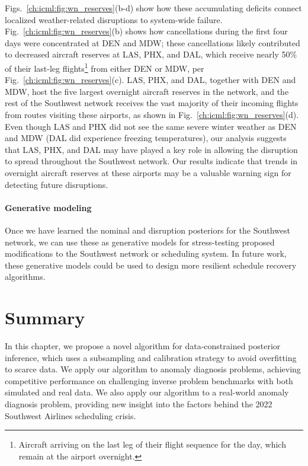 Figs.~\ref{ch:icml:fig:wn_reserves}(b-d) show how these accumulating deficits connect localized weather-related disruptions to system-wide failure. Fig.~\ref{ch:icml:fig:wn_reserves}(b) shows how cancellations during the first four days were concentrated at DEN and MDW; these cancellations likely contributed to decreased aircraft reserves at LAS, PHX, and DAL, which receive nearly 50\% of their last-leg flights\footnote{Aircraft arriving on the last leg of their flight sequence for the day, which remain at the airport overnight.} from either DEN or MDW, per Fig.~\ref{ch:icml:fig:wn_reserves}(c). LAS, PHX, and DAL, together with DEN and MDW, host the five largest overnight aircraft reserves in the network, and the rest of the Southwest network receives the vast majority of their incoming flights from routes visiting these airports, as shown in Fig.~\ref{ch:icml:fig:wn_reserves}(d). Even though LAS and PHX did not see the same severe winter weather as DEN and MDW (DAL did experience freezing temperatures), our analysis suggests that LAS, PHX, and DAL may have played a key role in allowing the disruption to spread throughout the Southwest network. Our results indicate that trends in overnight aircraft reserves at these airports may be a valuable warning sign for detecting future disruptions.

\paragraph{Generative modeling} Once we have learned the nominal and disruption posteriors for the Southwest network, we can use these as generative models for stress-testing proposed modifications to the Southwest network or scheduling system. In future work, these generative models could be used to design more resilient schedule recovery algorithms.

\section{Summary}\label{ch:icml:conclusion}

In this chapter, we propose a novel algorithm for data-constrained posterior inference, which uses a subsampling and calibration strategy to avoid overfitting to scarce data. We apply our algorithm to anomaly diagnosis problems, achieving competitive performance on challenging inverse problem benchmarks with both simulated and real data. We also apply our algorithm to a real-world anomaly diagnosis problem, providing new insight into the factors behind the 2022 Southwest Airlines scheduling crisis.

